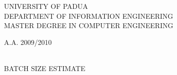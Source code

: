 \begin{titlepage}

		\thispagestyle{empty}
    \begin{figure}
    \centering
      \quad     {}
    \end{figure}
    
    \vskip 3cm{
    \begin{center}\sc
        UNIVERSITY OF PADUA\\
        DEPARTMENT OF INFORMATION ENGINEERING\\
        MASTER DEGREE IN COMPUTER ENGINEERING\end{center}
		}
		
		\vskip1.2cm\begin{center}
      \rm\large\uppercase\expandafter{A.A. 2009/2010\\}
 \end{center}
    	
    \vskip 2.5cm\begin{center}
    \HRule \\[0.4cm]\LARGE\expandafter{BATCH SIZE ESTIMATE}
    \HRule \\[0.4cm]
    \end{center}
    

\end{titlepage}
